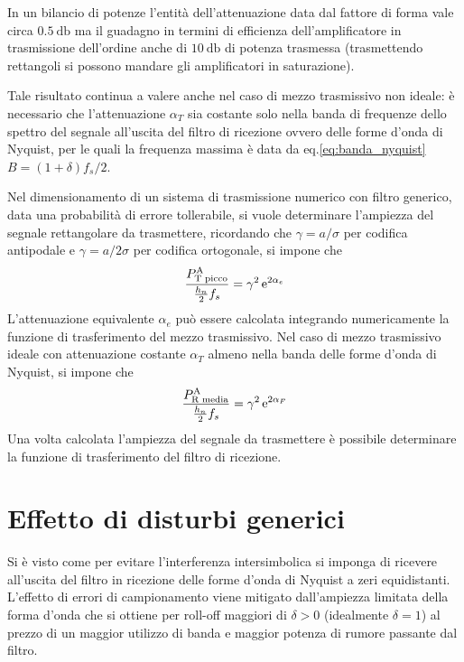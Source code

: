 In un bilancio di potenze l'entità dell'attenuazione data dal fattore di forma vale circa $\SI{0.5}{\decibel}$ ma il guadagno in termini di efficienza dell'amplificatore in trasmissione dell'ordine anche di $\SI{10}{\decibel}$ di potenza trasmessa (trasmettendo rettangoli si possono mandare gli amplificatori in saturazione).

Tale risultato continua a valere anche nel caso di mezzo trasmissivo non ideale: è necessario che l'attenuazione $\alpha_T$ sia costante solo nella banda di frequenze dello spettro del segnale all'uscita del filtro di ricezione ovvero delle forme d'onda di Nyquist, per le quali la frequenza massima è data da eq.\ref{eq:banda_nyquist} $B=(1+\delta)f_s/2$.

Nel dimensionamento di un sistema di trasmissione numerico con filtro generico, data una probabilità di errore tollerabile, si vuole determinare l'ampiezza del segnale rettangolare da trasmettere, ricordando che $\gamma=a/\sigma$ per codifica antipodale e $\gamma=a/2\sigma$ per codifica ortogonale, si impone che
\begin{equation}
\frac{P_\text{T picco}^\text{A}}{\frac{h_n}{2}f_s}=\gamma^2\operatorname{e}^{2\alpha_e}
\end{equation}
L'attenuazione equivalente $\alpha_e$ può essere calcolata integrando numericamente la funzione di trasferimento del mezzo trasmissivo. Nel caso di mezzo trasmissivo ideale con attenuazione costante $\alpha_T$ almeno nella banda delle forme d'onda di Nyquist, si impone che
\begin{equation}
\frac{P_\text{R media}^\text{A}}{\frac{h_n}{2}f_s}=\gamma^2\operatorname{e}^{2\alpha_F}
\end{equation}
Una volta calcolata l'ampiezza del segnale da trasmettere è possibile determinare la funzione di trasferimento del filtro di ricezione.

\section{Effetto di disturbi generici}
Si è visto come per evitare l'interferenza intersimbolica si imponga di ricevere all'uscita del filtro in ricezione delle forme d'onda di Nyquist a zeri equidistanti. L'effetto di errori di campionamento viene mitigato dall'ampiezza limitata della forma d'onda che si ottiene per roll-off maggiori di $\delta>0$ (idealmente $\delta=1$) al prezzo di un maggior utilizzo di banda e maggior potenza di rumore passante dal filtro.

